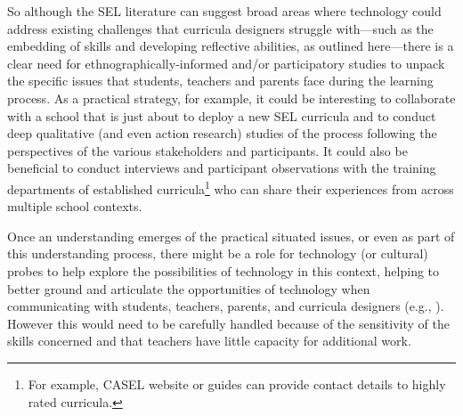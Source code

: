 \documentclass[prodmode,acmtochi]{acmsmall}
\newcommand{\todo}[1]{\textrm{\textrm{\textcolor{LightBlue}{[[#1]]}}}}
\newcommand{\Geraldine}[1]{\textrm{\textbf{\textcolor{Orange}{[[#1]]}}}}
\begin{document}

So although the SEL literature can suggest broad areas where technology could address existing challenges that curricula designers struggle with---such as the embedding of skills and developing reflective abilities, as outlined here---there is a clear need for ethnographically-informed and/or participatory studies to unpack the specific issues that students, teachers and parents face during the learning process. As a practical strategy, for example, it could be interesting to collaborate with a school that is just about to deploy a new SEL curricula and to conduct deep qualitative (and even action research) studies of the process following the perspectives of the various stakeholders and participants. It could also be beneficial to conduct interviews and participant observations with the training departments of established curricula\footnote{For example, CASEL website or guides \cite{CASEL2003,CASEL2013} can provide contact details to highly rated curricula.} who can share their experiences from across multiple school contexts. %
%

Once an understanding emerges of the practical situated issues, or even as part of this understanding process, there might be a role for technology (or cultural) probes to help explore the possibilities of technology in this context, helping to better ground and articulate the opportunities of technology when communicating with students, teachers, parents, and curricula designers (e.g., \cite{Kjeldskov2007,Hutchinson2003a,Vetere2005a,Lewin2010,Balaam2010,Marcu2012}). However this would need to be carefully handled because of the sensitivity of the skills concerned and that teachers have little capacity for additional work.
\end{document}
